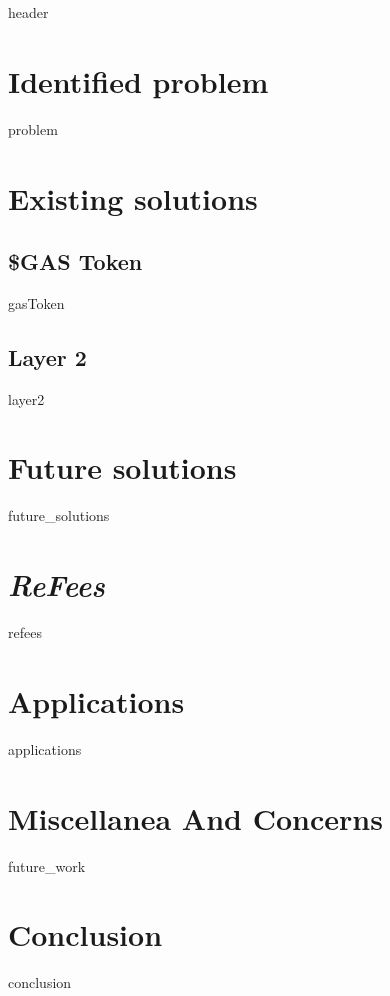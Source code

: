 \documentclass[conference]{IEEEtran}
\newcommand{\projectName}{\textit{ReFees}}
\begin{document}
{header}

\section{Identified problem}
{problem}
\section{Existing solutions}
\label{section:Existing_solutions}
\subsection{\$GAS Token}
{gasToken}
\subsection{Layer 2}
{layer2}

\section{Future solutions}
{future_solutions}
\section{\projectName}
{refees}
\section{Applications}
\label{section:Applications}
{applications}

\section{Miscellanea And Concerns}
{future_work}
\section{Conclusion}
{conclusion}


\end{document}
